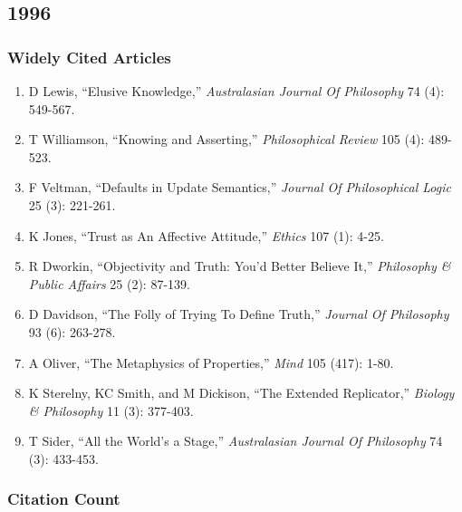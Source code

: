 \documentclass[
  10pt,
  letterpaper,
  DIV=11,
  numbers=noendperiod,
  twoside]{scrartcl}
\providecommand{\tightlist}{%
  \setlength{\itemsep}{0pt}\setlength{\parskip}{0pt}}\usepackage{longtable,booktabs,array}
\begin{document}
\newpage

\subsection{1996}\label{sec-s1996}

\subsubsection*{Widely Cited Articles}\label{widely-cited-articles-20}

\begin{enumerate}
\def\labelenumi{\arabic{enumi}.}
\tightlist
\item
  D Lewis, ``Elusive Knowledge,'' \emph{Australasian Journal Of
  Philosophy} 74 (4): 549-567.
\item
  T Williamson, ``Knowing and Asserting,'' \emph{Philosophical Review}
  105 (4): 489-523.
\item
  F Veltman, ``Defaults in Update Semantics,'' \emph{Journal Of
  Philosophical Logic} 25 (3): 221-261.
\item
  K Jones, ``Trust as An Affective Attitude,'' \emph{Ethics} 107 (1):
  4-25.
\item
  R Dworkin, ``Objectivity and Truth: You'd Better Believe It,''
  \emph{Philosophy \& Public Affairs} 25 (2): 87-139.
\item
  D Davidson, ``The Folly of Trying To Define Truth,'' \emph{Journal Of
  Philosophy} 93 (6): 263-278.
\item
  A Oliver, ``The Metaphysics of Properties,'' \emph{Mind} 105 (417):
  1-80.
\item
  K Sterelny, KC Smith, and M Dickison, ``The Extended Replicator,''
  \emph{Biology \& Philosophy} 11 (3): 377-403.
\item
  T Sider, ``All the World's a Stage,'' \emph{Australasian Journal Of
  Philosophy} 74 (3): 433-453.
\end{enumerate}

\subsubsection*{Citation Count}\label{sec-count-1996}
\end{document}
